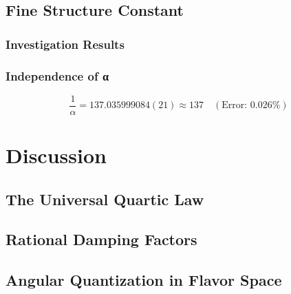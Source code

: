 \documentclass[11pt,a4paper]{article}
\begin{document}
\subsection{Fine Structure Constant}

\subsubsection{Investigation Results}

\subsubsection{Independence of α}

\begin{equation}
\frac{1}{\alpha} = 137.035999084(21) \approx 137 \quad (\text{Error: } 0.026\%)
\end{equation}

\section{Discussion}

\subsection{The Universal Quartic Law}

\subsection{Rational Damping Factors}

\subsection{Angular Quantization in Flavor Space}
\end{document}

